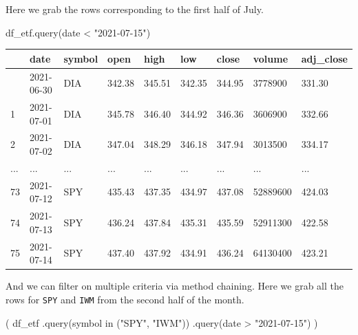 \documentclass[
  letterpaper,
  DIV=11,
  numbers=noendperiod]{scrreprt}
\newenvironment{Shaded}{\begin{snugshade}}{\end{snugshade}}
\newcommand{\NormalTok}[1]{\textcolor[rgb]{0.00,0.23,0.31}{#1}}
\newcommand{\StringTok}[1]{\textcolor[rgb]{0.13,0.47,0.30}{#1}}
\begin{document}
Here we grab the rows corresponding to the first half of July.

\begin{Shaded}
\begin{Highlighting}[]
\NormalTok{df\_etf.query(}\StringTok{\textquotesingle{}date \textless{} "2021{-}07{-}15"\textquotesingle{}}\NormalTok{)}
\end{Highlighting}
\end{Shaded}

\begin{longtable}[]{@{}lllllllll@{}}
\toprule\noalign{}
& date & symbol & open & high & low & close & volume & adj\_close \\
\midrule\noalign{}
\endhead
\bottomrule\noalign{}
\endlastfoot
0 & 2021-06-30 & DIA & 342.38 & 345.51 & 342.35 & 344.95 & 3778900 &
331.30 \\
1 & 2021-07-01 & DIA & 345.78 & 346.40 & 344.92 & 346.36 & 3606900 &
332.66 \\
2 & 2021-07-02 & DIA & 347.04 & 348.29 & 346.18 & 347.94 & 3013500 &
334.17 \\
... & ... & ... & ... & ... & ... & ... & ... & ... \\
73 & 2021-07-12 & SPY & 435.43 & 437.35 & 434.97 & 437.08 & 52889600 &
424.03 \\
74 & 2021-07-13 & SPY & 436.24 & 437.84 & 435.31 & 435.59 & 52911300 &
422.58 \\
75 & 2021-07-14 & SPY & 437.40 & 437.92 & 434.91 & 436.24 & 64130400 &
423.21 \\
\end{longtable}

And we can filter on multiple criteria via method chaining. Here we grab
all the rows for \texttt{SPY} and \texttt{IWM} from the second half of
the month.

\begin{Shaded}
\begin{Highlighting}[]
\NormalTok{(}
\NormalTok{df\_etf}
\NormalTok{    .query(}\StringTok{\textquotesingle{}symbol in ("SPY", "IWM")\textquotesingle{}}\NormalTok{)}
\NormalTok{    .query(}\StringTok{\textquotesingle{}date \textgreater{} "2021{-}07{-}15"\textquotesingle{}}\NormalTok{)}
\NormalTok{)}
\end{Highlighting}
\end{Shaded}
\end{document}
